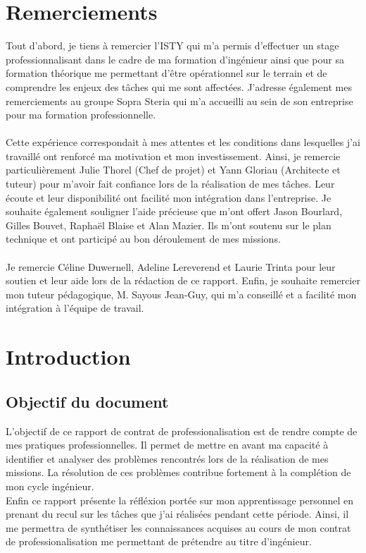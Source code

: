 \documentclass[12pt,a4paper]{article}
\begin{document}
\section{Remerciements}
Tout d'abord, je tiens à remercier l'\gls{ISTY} qui m'a permis d'effectuer un stage professionnalisant dans le cadre de ma formation d'ingénieur ainsi que pour sa formation théorique me permettant d'être opérationnel sur le terrain et de comprendre les enjeux des tâches qui me sont affectées. J'adresse également mes remerciements au groupe Sopra Steria qui m'a accueilli au sein de son entreprise pour ma formation professionnelle.\\\\ Cette expérience correspondait à mes attentes et les conditions dans lesquelles j'ai travaillé ont renforcé ma motivation et  mon investissement. Ainsi, je remercie particulièrement Julie Thorel (Chef de projet) et Yann Gloriau (Architecte et tuteur) pour m'avoir fait confiance lors de la réalisation de mes tâches. Leur écoute et leur disponibilité ont facilité mon intégration dans l'entreprise. Je souhaite également souligner l'aide précieuse que m'ont offert Jason Bourlard, Gilles Bouvet, Raphaël Blaise et Alan Mazier. Ils m'ont soutenu sur le plan technique et ont participé au bon déroulement de mes missions.\\\\ Je remercie Céline Duwernell, Adeline Lereverend et Laurie Trinta pour leur soutien et leur aide lors de la rédaction de ce rapport. Enfin, je souhaite remercier mon tuteur pédagogique,  M. Sayous Jean-Guy, qui m'a conseillé et a facilité mon intégration à l'équipe de travail. 
\newpage
\section{Introduction}
\subsection{Objectif du document}
L'objectif de ce rapport de contrat de professionalisation est de rendre compte de mes pratiques professionnelles. Il permet de mettre en avant ma capacité à identifier et analyser des problèmes rencontrés lors de la réalisation de mes missions. La résolution de ces problèmes contribue fortement à la complétion de mon cycle ingénieur.\\
Enfin ce rapport présente la réfléxion portée sur mon apprentissage personnel en prenant du recul sur les tâches que j'ai réalisées pendant cette période. Ainsi, il me permettra de synthétiser les connaissances acquises au cours de mon contrat de professionalisation me permettant de prétendre au titre d'ingénieur.
\end{document}
